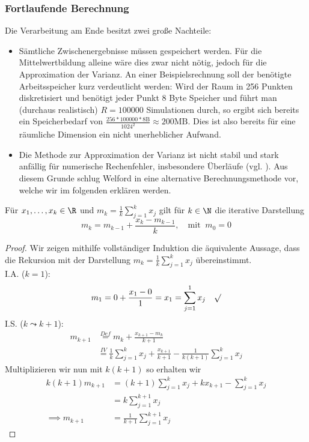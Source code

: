 \subsubsection*{Fortlaufende Berechnung}
Die Verarbeitung am Ende besitzt zwei große Nachteile:
\begin{itemize}
\item Sämtliche Zwischenergebnisse müssen gespeichert werden. Für die Mittelwertbildung alleine wäre dies zwar nicht nötig, jedoch für die Approximation der Varianz. An einer Beispielsrechnung soll der benötigte Arbeitsspeicher kurz verdeutlicht werden: Wird der Raum in 256 Punkten diskretisiert und benötigt jeder Punkt 8 Byte Speicher und führt man (durchaus realistisch) $R=100000$ Simulationen durch, so ergibt sich bereits ein Speicherbedarf von $\frac{256*100000*8\text{B}}{1024^2}\approx 200\text{MB}$. Dies ist also bereits für eine räumliche Dimension ein nicht unerheblicher Aufwand.
\item Die Methode zur Approximation der Varianz ist nicht stabil und stark anfällig für numerische Rechenfehler, insbesondere Überläufe (vgl. \autocite{cook08}). Aus diesem Grunde schlug Welford in \autocite{welford62} eine alternative Berechnungsmethode vor, welche wir im folgenden erklären werden.
\end{itemize}
\begin{maththeorem}
\label{thiterativemk}
Für $x_1,\dots,x_k\in\R$ und $m_k=\frac{1}{k}\sum_{j=1}^kx_j$ gilt für $k\in\N$ die iterative Darstellung
\[m_k=m_{k-1}+\frac{x_k-m_{k-1}}{k},\quad \text{mit }\: m_0=0\]
\end{maththeorem}
\begin{proof}
Wir zeigen mithilfe vollständiger Induktion die äquivalente Aussage, dass die Rekursion mit der Darstellung $m_k=\frac{1}{k}\sum_{j=1}^kx_j$ übereinstimmt.\\
I.A. ($k=1$): \[m_1=0+\frac{x_1-0}{1}=x_1=\sum_{j=1}^1x_j\quad\surd\]
I.S. ($k\leadsto k+1$):
\begin{align*}
m_{k+1}&\stackrel{Def}{=}m_k+\frac{x_{k+1}-m_k}{k+1}\\
&\stackrel{IV}{=}\frac{1}{k}\sum_{j=1}^kx_j+\frac{x_{k+1}}{k+1}-\frac{1}{k(k+1)}\sum_{j=1}^kx_j
\end{align*}
Multiplizieren wir nun mit $k(k+1)$ so erhalten wir
\begin{align*}
k(k+1)m_{k+1}&=(k+1)\sum_{j=1}^kx_j+kx_{k+1}-\sum_{j=1}^kx_j\\
&=k\sum_{j=1}^{k+1}x_j\\
\implies m_{k+1}&=\frac{1}{k+1}\sum_{j=1}^{k+1}x_j
\end{align*}
\end{proof}
